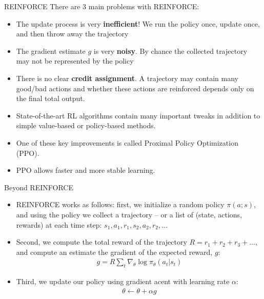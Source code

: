 \documentclass[10pt,mathserif]{beamer}
\begin{document}
\begin{frame}{REINFORCE}
There are 3 main problems with REINFORCE:
\begin{itemize}
\item The update process is very \textbf{inefficient}! We run the policy once, update once, and then throw
away the trajectory
\item The gradient estimate $g$ is very \textbf{noisy}. By chance the collected trajectory may not be represented
by the policy
\item There is no clear \textbf{credit assignment}. A trajectory may contain many good/bad actions and whether these actions are reinforced depends only on the final total output.
\end{itemize}
\end{frame}


\begin{frame}{}
\begin{itemize}
\item State-of-the-art RL algorithms contain many important tweaks in addition to simple
value-based or policy-based methods. 
\item One of these key improvements is called Proximal Policy Optimization (PPO).
\item PPO allows faster and more stable learning.
\end{itemize}
\end{frame}

\begin{frame}{Beyond REINFORCE}
\begin{itemize}
\item REINFORCE works as follows: first, we initialize a random policy $\pi(a;s)$, and using
the policy we collect a trajectory -- or a list of (state, actions, rewards) at each time 
step: $s_1, a_1, r_1, s_2, a_2, r_2, \dots$
\item Second, we compute the total reward of the trajectory $R = r_1 + r_2 + r_3 + \dots $,
and compute an estimate the gradient of the expected reward, $g$:
\begin{align}
g = R\sum_t\nabla_\theta \log \pi_\theta(a_t |s_t)
\end{align}
\item Third, we update our policy using gradient acent with learning rate $\alpha$:
\begin{align}
\theta \leftarrow \theta + \alpha g
\end{align}
\end{itemize}
\end{frame}
\end{document}

